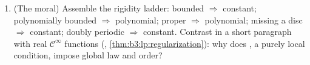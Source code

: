 \begin{problem}
\begin{enumerate}[resume]
        values on $\R$ satisfies $f(\bar z) =
        \overline{f(z)}$ everywhere \emph{(compare Taylor
        coefficients at $0$, or apply the identity theorem
        to $z \mapsto \overline{f(\bar z)}$)}; deduce again
        that nonreal roots of real polynomials come in
        conjugate pairs (question 8's pairing, reproved
        analytically).
  \item (The moral) Assemble the rigidity ladder: bounded
        $\Rightarrow$ constant; polynomially bounded
        $\Rightarrow$ polynomial; proper $\Rightarrow$
        polynomial; missing a disc $\Rightarrow$ constant;
        doubly periodic $\Rightarrow$ constant. Contrast in a
        short paragraph with real $\mathcal C^\infty$
        functions (,
        \cref{thm:b3:lp:regularization}): why does
        , a purely local condition, impose global
        law and order?
\end{enumerate}


\end{problem}
